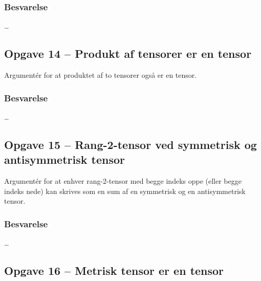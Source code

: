 \documentclass[../main.tex]{subfiles}
\begin{document}

\subsubsection{Besvarelse}

\ldots




\subsection{Opgave 14 -- Produkt af tensorer er en tensor}
\setcounter{subsection}{14}
\setcounter{equation}{0}

Argumentér for at produktet af to tensorer også er en tensor.


\subsubsection{Besvarelse}

\ldots




\subsection{Opgave 15 -- Rang-2-tensor ved symmetrisk og antisymmetrisk tensor}
\setcounter{subsection}{15}
\setcounter{equation}{0}

Argumentér for at enhver rang-2-tensor med begge indeks oppe (eller begge indeks nede) kan skrives som en sum af en symmetrisk og en antisymmetrisk tensor.


\subsubsection{Besvarelse}

\ldots




\subsection{Opgave 16 -- Metrisk tensor er en tensor}
\setcounter{subsection}{16}
\setcounter{equation}{0}
\end{document}
